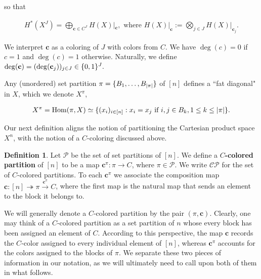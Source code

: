 \documentclass[11pt,reqno]{amsproc}
\numberwithin{equation}{section}
\theoremstyle{definition}
\newtheorem{definition}[theorem]{Definition}
\theoremstyle{remark}
\DeclareMathOperator{\Hom}{Hom}
\newcommand\onto{\twoheadrightarrow}
\newcommand{\map}[1][]{{\xrightarrow{#1}}} %
\DeclarePairedDelimiter{\abs}{\lvert}{\rvert}
\DeclarePairedDelimiter{\set}{\{}{\}}
\newcommand{\defn}{\textbf}
\begin{document}
so that

\begin{align*}
H^*(X^J)=\bigoplus_{\mathbf{c}\in C^J} H(X)|_{\mathbf{c}}, \text{ where } H(X)|_{\mathbf{c}}:=\bigotimes_{j\in J} H(X)|_{\mathbf{c}_j}.
\end{align*}

We interpret $\mathbf{c}$ as a coloring of $J$ with colors from $C$. We have $\deg(c)=0$ if $c=1$ and $\deg(c)=1$ otherwise. Naturally, we define $\deg(\mathbf{c})=(\deg(\mathbf{c}_j))_{j\in J}\in \set{0,1}^J.$

Any (unordered) set partition $\pi = \set{B_1,\dots,B_{\abs{\pi}}}$ of $[n]$ defines a ``fat diagonal" in $X$, which we denote $X^{\pi}$,

\begin{align*}
X^\pi = \Hom(\pi,X) \simeq \set{(x_i)_{i\in [n]}: x_i=x_j\text{ if }i,j\in B_k, 1\leq k\leq \abs{\pi}}.
\end{align*}


Our next definition aligns the notion of partitioning the Cartesian product space $X^n$, with the notion of a $C$-coloring discussed above. 

\begin{definition}
    Let $\mathcal{P}$ be the set of set partitions of $[n]$. We define a \defn{$C$-colored partition} of $[n]$ to be a map $\mathbf{c}^\pi:\pi\to C$, where $\pi\in \mathcal{P}$. We write $\mathcal{CP}$ for the set of $C$-colored partitions. To each $\mathbf{c}^\pi$ we associate the composition map $\mathbf{c}:[n]\onto \pi \map[\mathbf{c}^\pi] C$, where the first map is the natural map that sends an element to the block it belongs to. 
\end{definition}

We will generally denote a $C$-colored partition by the pair $(\pi,\mathbf{c})$. Clearly, one may think of a $C$-colored partition as a set partition of $n$ whose every block has been assigned an element of $C$. According to this perspective, the map $\mathbf{c}$ records the $C$-color assigned to every individual element of $[n]$, whereas $\mathbf{c}^\pi$ accounts for the colors assigned to the blocks of $\pi$. We separate these two pieces of information in our notation, as we will ultimately need to call upon both of them in what follows.
\end{document}
